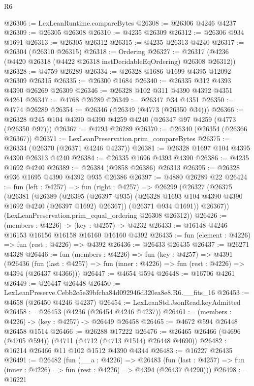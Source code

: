 \begin{lexlean}{R6}
\begin{coremodule}
@26306 := LexLeanRuntime.compareBytes
@26308 := @26306 @4246 @4237
@26309 := @26305 @26308
@26310 := @4235 @26309
@26312 := @26306 @934 @1691
@26313 := @26305 @26312
@26315 := @4235 @26313 @4240
@26317 := @26304 (@26310 @26315)
@26318 := Ordering
@26327 := @26317 (@4236 (@4420 @26318 (@4422 @26318 instDecidableEqOrdering) @26308 @26312))
@26328 := @4759 @26289
@26334 := @26328 @1686 @1699 @4395 @12092 @26309 @26315
@26335 := @26300 @1684
@26340 := @26335 @312 @4393 @4390 @26269 @26309
@26346 := @26328 @102 @311 @4390 @4392 @4351 @4261
@26347 := @4768 @26289
@26349 := @26347 @34 @4351
@26350 := @4774 @26289
@26354 := @26346 (@26349 (@4773 (@26350 @34)))
@26366 := @26328 @245 @104 @4390 @4390 @4259 @4240 (@26347 @97 @4259 (@4773 (@26350 @97)))
@26367 := @4793 @26289
@26370 := @26340 (@26354 (@26366 @26367))
@26371 := LexLeanPreservation.prim_compareBytes
@26375 := @26334 (@26370 (@26371 @4246 @4237))
@26381 := @26328 @1697 @104 @4395 @4390 @26313 @4240
@26384 := @26335 @1696 @4393 @4390
@26386 := @4235 @1692 @4240
@26389 := @26384 (@9858 @26386) @26313
@26395 := @26328 @936 @1695 @4390 @4392 @935 @26386
@26397 := @4880 @26289 @22
@26424 := fun (left : @4257) =>
  fun (right : @4257) =>
  @26299
    (@26327
      (@26375
        (@26381
          (@26389
            (@26395 (@26397 @935) (@26328 @1693 @104 @4390 @4390 @1692 @4240 (@26397 @1692) @26367))
            (@26371 @934 @1691))
          @26367))
      (LexLeanPreservation.prim_equal_ordering @26308 @26312))
@26426 := (members : @4226) -> (key : @4257) -> @4232
@26433 := @16148 @4246 @16153 @16156 @16158 @16160 @16160 @4392
@26435 := fun (element : @4226) => fun (rest : @4226) => @4392
@26436 := @26433 @26435
@26437 := @26271 @4328
@26446 := fun (members : @4226) =>
  fun (key : @4257) =>
  @4391
    (@26436
      (fun (last : @4257) => fun (inner : @4226) => fun (rest : @4226) => @4394 (@26437 @4366)))
@26447 := @4654 @594
@26448 := @16706 @4261
@26449 := @26447 @26448
@26450 := LexLeanPreserve.Cebb2c5e39bfcba84d092946d320ea8e8.R6.__fits_16
@26453 := @4658 (@26450 @4246 @4237)
@26454 := LexLeanStd.JsonRead.keyAdmitted
@26458 := @26453 (@4236 (@26454 @4246 @4237))
@26461 := (members : @4226) -> (key : @4257) -> @26449 @26458
@26465 := @4672 @594 @26448 @26458 @1514
@26466 := @26288 @17222
@26476 := @26465 @26466 (@4696 (@4705 @594)) (@4711 (@4712 (@4713 @1514) @26448 @4690))
@26482 := @16214 @26466 @11 @102 @1512 @4390 @4344
@26483 := @16227 @26435
@26491 := @26482
    (fun (__a : @4226) =>
    @26483
      (fun (last : @4257) => fun (inner : @4226) => fun (rest : @4226) => @4394 (@26437 @4290)))
@26498 := @16221

\end{coremodule}
\end{lexlean}
